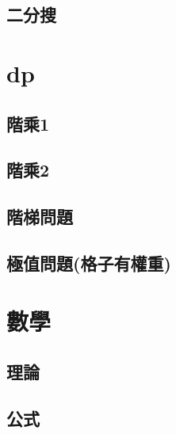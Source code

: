    \subsection{二分搜}
        
\section{dp}
    \subsection{階乘1}
        
    \subsection{階乘2}
        
    \subsection{階梯問題}
        
     \subsection{極值問題(格子有權重)}
        
\section{數學}
    \subsection{理論}
        
    \subsection{公式}
        
